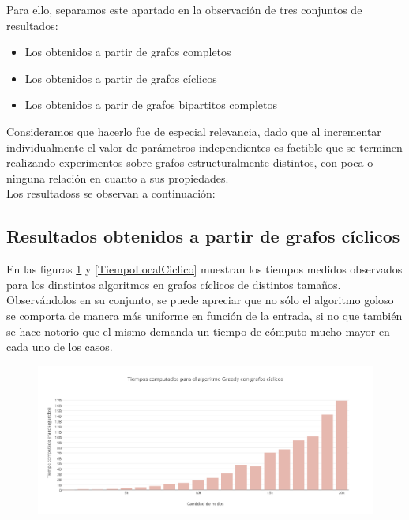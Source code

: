 Para ello, separamos este apartado en la observación de tres conjuntos de resultados:

\begin{itemize}
\item {Los obtenidos a partir de grafos completos}
\item {Los obtenidos a partir de grafos cíclicos}
\item {Los obtenidos a parir de grafos bipartitos completos}
\end{itemize}

Consideramos que hacerlo fue de especial relevancia, dado que al incrementar individualmente el valor de parámetros independientes es factible que se terminen realizando experimentos sobre grafos estructuralmente distintos, con poca o ninguna relación en cuanto a sus propiedades.\\
Los resultadoss se observan a continuación:\\


\subsection {Resultados obtenidos a partir de grafos cíclicos} 

En las figuras \ref{TiempoGreedyCiclico} y \ref{TiempoLocalCiclico} muestran los tiempos medidos observados para los dinstintos algoritmos en grafos cíclicos de distintos tamaños. \\
Observándolos en su conjunto, se puede apreciar que no sólo el algoritmo goloso se comporta de manera más uniforme en función de la entrada, si no que también se hace notorio que el mismo demanda un tiempo de cómputo mucho mayor en cada uno de los casos.\\  
 
\begin{figure}[H]
    \begin{center}
  	\includegraphics[width=18cm]{imagenes/Ej5/TiempoGreedyCiclico.png}
 	\label{TiempoGreedyCiclico}
    \end{center}
  \end{figure}

